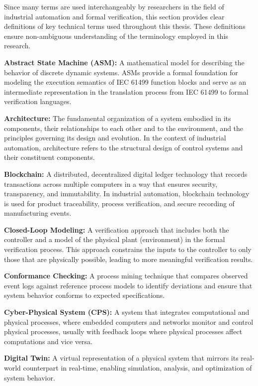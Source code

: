 Since many terms are used interchangeably by researchers in the field of industrial automation and formal verification, this section provides clear definitions of key technical terms used throughout this thesis. These definitions ensure non-ambiguous understanding of the terminology employed in this research.

\textbf{Abstract State Machine (ASM):} A mathematical model for describing the behavior of discrete dynamic systems. ASMs provide a formal foundation for modeling the execution semantics of IEC 61499 function blocks and serve as an intermediate representation in the translation process from IEC 61499 to formal verification languages.

\textbf{Architecture:} The fundamental organization of a system embodied in its components, their relationships to each other and to the environment, and the principles governing its design and evolution. In the context of industrial automation, architecture refers to the structural design of control systems and their constituent components.

\textbf{Blockchain:} A distributed, decentralized digital ledger technology that records transactions across multiple computers in a way that ensures security, transparency, and immutability. In industrial automation, blockchain technology is used for product traceability, process verification, and secure recording of manufacturing events.

\textbf{Closed-Loop Modeling:} A verification approach that includes both the controller and a model of the physical plant (environment) in the formal verification process. This approach constrains the inputs to the controller to only those that are physically possible, leading to more meaningful verification results.

\textbf{Conformance Checking:} A process mining technique that compares observed event logs against reference process models to identify deviations and ensure that system behavior conforms to expected specifications.

\textbf{Cyber-Physical System (CPS):} A system that integrates computational and physical processes, where embedded computers and networks monitor and control physical processes, usually with feedback loops where physical processes affect computations and vice versa.

\textbf{Digital Twin:} A virtual representation of a physical system that mirrors its real-world counterpart in real-time, enabling simulation, analysis, and optimization of system behavior.

